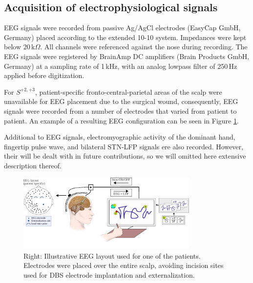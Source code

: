 \documentclass[10pt,a4paper, twocolumn]{article}
\newcommand{\patient}[2]{$S_{#1}^{#2}$}
\begin{document}

\subsection{Acquisition of electrophysiological signals}

EEG signals were recorded from passive Ag/AgCl electrodes (EasyCap GmbH, Germany) placed according to the extended 10-10 system. Impedances were kept below 20\,k$\Omega$. All channels were referenced against the nose during recording. The EEG signals were registered by BrainAmp DC amplifiers (Brain Products GmbH, Germany) at a sampling rate of 1\,kHz, with an analog lowpass filter of 250\,Hz applied before digitization.

For \patient{}{+2,+3}, patient-specific fronto-central-parietal areas of the scalp were unavailable for EEG placement due to the surgical wound, consequently, EEG signals were recorded from a number of electrodes that varied from patient to patient. An example of a resulting EEG configuration can be seen in Figure \ref{fig:paradigm_layout}.

Additional to EEG signals, electromyographic activity of the dominant hand, fingertip pulse wave, and bilateral STN-LFP signals ere also recorded. However, their will be dealt with in future contributions, so we will omitted here extensive description thereof.

\begin{figure}[h!]
\centering
\includegraphics[width=0.8\textwidth]{figures/paradigm_layout}
\vspace{-12pt}
\caption{Right: Illustrative EEG layout used for one of the patients. Electrodes were placed over the entire scalp, avoiding incision sites used for DBS electrode implantation and externalization.}
\label{fig:paradigm_layout}
\end{figure}
\end{document}
